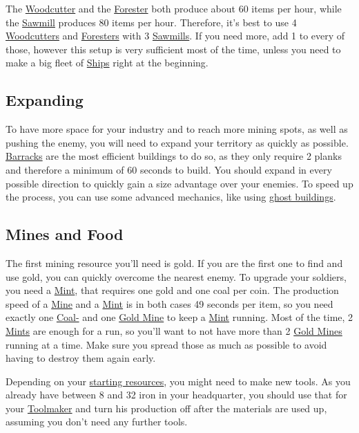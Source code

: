\documentclass[11pt]{article}
\begin{document}
The \hyperref[woodcutter]{Woodcutter} and the \hyperref[forester]{Forester} both produce about 60 items per hour, while the \hyperref[sawmill]{Sawmill} produces 80 items per hour. Therefore, it's best to use 4 \hyperref[woodcutter]{Woodcutters} and \hyperref[forester]{Foresters} with 3 \hyperref[sawmill]{Sawmills}. If you need more, add 1 to every of those, however this setup is very sufficient most of the time, unless you need to make a big fleet of \hyperref[ship]{Ships} right at the beginning.

\subsection{Expanding}
\label{sec:expanding}

To have more space for your industry and to reach more mining spots, as well as pushing the enemy, you will need to expand your territory as quickly as possible. \hyperref[barrack]{Barracks} are the most efficient buildings to do so, as they only require 2 planks and therefore a minimum of 60 seconds to build. You should expand in every possible direction to quickly gain a size advantage over your enemies. To speed up the process, you can use some advanced mechanics, like using \hyperref[ghostbuildings]{ghost buildings}.

\subsection{Mines and Food}
\label{sec:minesandfoot}

The first mining resource you'll need is gold. If you are the first one to find and use gold, you can quickly overcome the nearest enemy. To upgrade your soldiers, you need a \hyperref[mint]{Mint}, that requires one gold and one coal per coin. The production speed of a \hyperref[mine]{Mine} and a \hyperref[mint]{Mint} is in both cases 49 seconds per item, so you need exactly one \hyperref[coalmine]{Coal-} and one \hyperref[goldmine]{Gold Mine} to keep a \hyperref[mint]{Mint} running. Most of the time, 2 \hyperref[mint]{Mints} are enough for a run, so you'll want to not have more than 2 \hyperref[goldmine]{Gold Mines} running at a time. Make sure you spread those as much as possible to avoid having to destroy them again early.

Depending on your \hyperref[startresources]{starting resources}, you might need to make new tools. As you already have between 8 and 32 iron in your headquarter, you should use that for your \hyperref[toolmaker]{Toolmaker} and turn his production off after the materials are used up, assuming you don't need any further tools.
\end{document}
